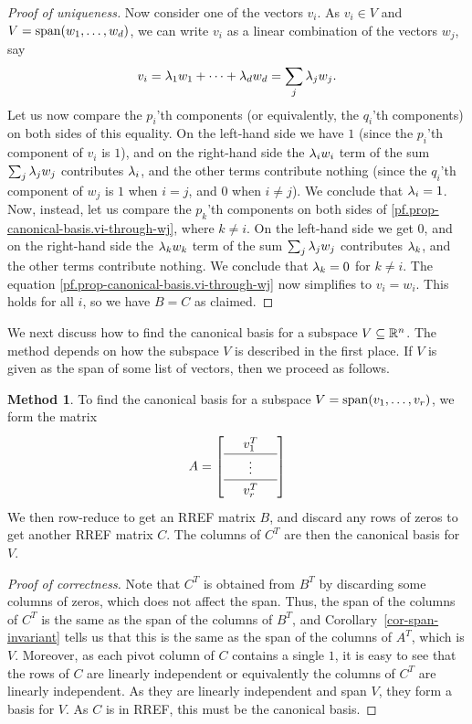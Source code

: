 \documentclass[reqno]{amsart}
\theoremstyle{definition}
\newtheorem{method}[theorem]{Method}
\begin{document}
\begin{proof}[Proof of uniqueness]
 Now consider one of the vectors $v_i$.  As $v_i\in V$ and
 $V=\operatorname{span}(w_1,\dotsc,w_d)$, we can write $v_i$ as a linear combination
 of the vectors $w_j$, say
 \begin{equation}
 v_i=\lambda_1w_1+\dotsb+\lambda_dw_d = \sum_j \lambda_j w_j .
 \label{pf.prop-canonical-basis.vi-through-wj}
 \end{equation}
 Let us now compare the $p_i$'th components (or equivalently, the $q_i$'th
 components) on both sides of this equality.
 On the left-hand side we have $1$ (since the $p_i$'th
 component of $v_i$ is $1$), and on the right-hand
 side the $\lambda_i w_i$ term of the sum $\sum_j \lambda_j w_j$ contributes
 $\lambda_i$, and the other terms contribute nothing (since the $q_i$'th
 component of $w_j$ is $1$ when $i=j$, and $0$ when $i\neq j$).
 We conclude that $\lambda_i=1$.  Now, instead, let us compare
 the $p_k$'th components on both sides of
 \eqref{pf.prop-canonical-basis.vi-through-wj}, where $k\neq i$.
 On the left-hand side we get $0$, and on the right-hand side the
 $\lambda_k w_k$ term of the sum $\sum_j \lambda_j w_j$
 contributes $\lambda_k$, and the other terms contribute nothing.  We
 conclude that $\lambda_k = 0$ for $k\neq i$.  The equation
 \eqref{pf.prop-canonical-basis.vi-through-wj} now simplifies to
 $v_i = w_i$.  This holds for all $i$, so we have $B=C$ as claimed.
\end{proof}

We next discuss how to find the canonical basis for a subspace
$V\subseteq{\mathbb{R}}^n$.  The method depends on how the subspace $V$ is described
in the first place.  If $V$ is given as the span of some list of
vectors, then we proceed as follows.

\begin{method}\label{meth-span-canonical}
 To find the canonical basis for a subspace $V=\operatorname{span}(v_1,\dotsc,v_r)$,
 we form the matrix
 \[ \renewcommand{\arraystretch}{1.3}
    A = \left[\begin{array}{ccc}
         & v_1^T & \\ \hline
         & \vdots & \\ \hline
         & v_r^T &
        \end{array}\right]
 \]
 We then row-reduce to get an RREF matrix $B$, and discard any rows of
 zeros to get another RREF matrix $C$.  The columns of $C^T$ are then
 the canonical basis for $V$.
\end{method}

\begin{proof}[Proof of correctness]
 Note that $C^T$ is obtained from $B^T$ by discarding some columns of
 zeros, which does not affect the span.  Thus, the span of the columns
 of $C^T$ is the same as the span of the columns of $B^T$, and
 Corollary~\ref{cor-span-invariant} tells us that this is the same as
 the span of the columns of $A^T$, which is $V$.  Moreover, as each
 pivot column of $C$ contains a single $1$, it is easy to see that the
 rows of $C$ are linearly independent or equivalently the columns of
 $C^T$ are linearly independent.  As they are linearly independent and
 span $V$, they form a basis for $V$.  As $C$ is in RREF, this must be
 the canonical basis.
\end{proof}
\end{document}
